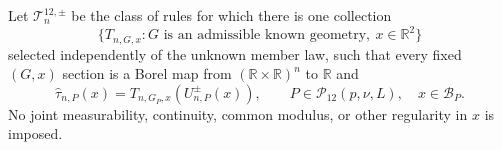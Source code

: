 Let \(\mathcal T^{12,\pm}_n\) be the class of rules for which there is one collection
\[
 \{T_{n,G,x}:G\text{ is an admissible known geometry},\ x\in\mathbb R^2\}
\]
selected independently of the unknown member law, such that every fixed \((G,x)\) section is a Borel map from \((\mathbb R\times\mathbb R)^n\) to \(\mathbb R\) and
\[
 \widehat\tau_{n,P}(x)=T_{n,G_P,x}(U^{\pm}_{n,P}(x)),
 \qquad P\in\mathcal P_{12}(p,\nu,L),\quad x\in\mathcal B_P.
\]
No joint measurability, continuity, common modulus, or other regularity in \(x\) is imposed.